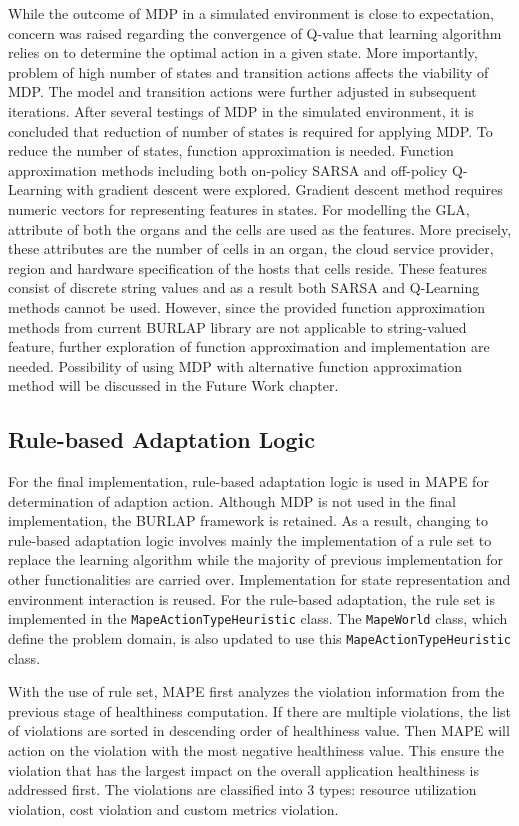 \documentclass{seal_thesis}
\begin{document}
While the outcome of MDP in a simulated environment is close to expectation, concern was raised regarding the convergence of Q-value that learning algorithm relies on to determine the optimal action in a given state.
More importantly, problem of high number of states and transition actions affects the viability of MDP.
The model and transition actions were further adjusted in subsequent iterations.
After several testings of MDP in the simulated environment, it is concluded that reduction of number of states is required for applying MDP.
To reduce the number of states, function approximation is needed.
Function approximation methods including both on-policy SARSA and off-policy Q-Learning with gradient descent were explored.
Gradient descent method requires numeric vectors for representing features in states.
For modelling the GLA, attribute of both the organs and the cells are used as the features.
More precisely, these attributes are the number of cells in an organ, the cloud service provider, region and hardware specification of the hosts that cells reside.
These features consist of discrete string values and as a result both SARSA and Q-Learning methods cannot be used.
However, since the provided function approximation methods from current BURLAP library are not applicable to string-valued feature, further exploration of function approximation and implementation are needed.
Possibility of using MDP with alternative function approximation method will be discussed in the Future Work chapter.

\subsection{Rule-based Adaptation Logic} \label{RBAdaptationLogic}
For the final implementation, rule-based adaptation logic is used in MAPE for determination of adaption action. 
Although MDP is not used in the final implementation, the BURLAP framework is retained.
As a result, changing to rule-based adaptation logic involves mainly the implementation of a rule set to replace the learning algorithm while the majority of previous implementation for other functionalities are carried over.
Implementation for state representation and environment interaction is reused.
For the rule-based adaptation, the rule set is implemented in the \texttt{MapeActionTypeHeuristic} class.
The \texttt{MapeWorld} class, which define the problem domain, is also updated to use this \texttt{MapeActionTypeHeuristic} class.

With the use of rule set, MAPE first analyzes the violation information from the previous stage of healthiness computation.
If there are multiple violations, the list of violations are sorted in descending order of healthiness value.
Then MAPE will action on the violation with the most negative healthiness value.
This ensure the violation that has the largest impact on the overall application healthiness is addressed first.
The violations are classified into 3 types: resource utilization violation, cost violation and custom metrics violation.
\end{document}
